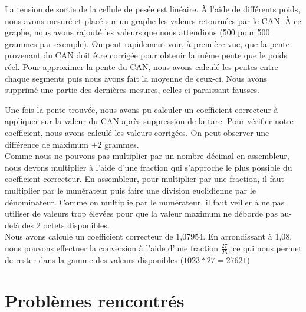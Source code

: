 \documentclass[a4paper,11pt,titlepage]{article}
\begin{document}
La tension de sortie de la cellule de pesée est linéaire. À l'aide de différents poids, nous avons mesuré et placé sur un graphe les valeurs retournées par le CAN. À ce graphe, nous avons rajouté les valeurs que nous attendions (500 pour 500 grammes par exemple). On peut rapidement voir, à première vue, que la pente provenant du CAN doit être corrigée pour obtenir la même pente que le poids réel. Pour approximer la pente du CAN, nous avons calculé les pentes entre chaque segments puis nous avons fait la moyenne de ceux-ci. Nous avons supprimé une partie des dernières mesures, celles-ci paraissant fausses.\\


Une fois la pente trouvée, nous avons pu calculer un coefficient correcteur à appliquer sur la valeur du CAN après suppression de la tare. Pour vérifier notre coefficient, nous avons calculé les valeurs corrigées. On peut observer une différence de maximum $\pm{2}$ grammes.\\

Comme nous ne pouvons pas multiplier par un nombre décimal en assembleur, nous devons multiplier à l'aide d'une fraction qui s'approche le plus possible du coefficient correcteur. En assembleur, pour multiplier par une fraction, il faut multiplier par le numérateur puis faire une division euclidienne par le dénominateur. Comme on multiplie par le numérateur, il faut veiller à ne pas utiliser de valeurs trop élevées pour que la valeur maximum ne déborde pas au-delà des 2 octets disponibles.\\

Nous avons calculé un coefficient correcteur de 1,07954. En arrondissant à 1,08, nous pouvons effectuer la conversion à l'aide d'une fraction $\frac{27}{25}$, ce qui nous permet de rester dans la gamme des valeurs disponibles ($1023 * 27 = 27621$)\\

\section{Problèmes rencontrés}
\end{document}
